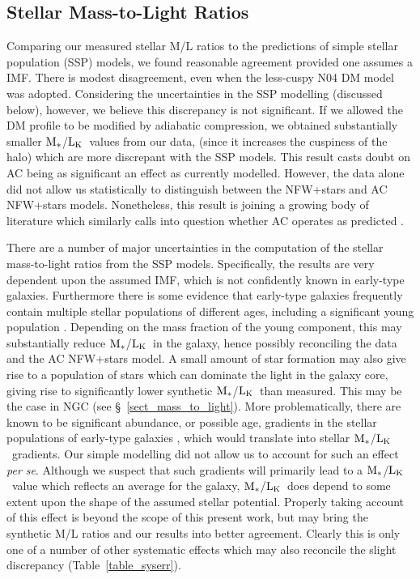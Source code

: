 \documentclass{emulateapj}
\def \eg {e.g.}
\newcommand{\mstars}{${\rm M_{*}}$}
\newcommand{\lk }{${\rm L_K}$}
\newcommand{\thin}{\thinspace}
\begin{document}
\subsection{Stellar Mass-to-Light Ratios} \label{discussion_mass_to_light}
Comparing our measured stellar M/L ratios
to the predictions of simple stellar population (SSP)
models, we found reasonable agreement provided one assumes
a \citet{kroupa01a} IMF. There is modest disagreement,
even when the less-cuspy N04 DM model was adopted.
Considering the uncertainties in the SSP modelling 
(discussed below), however, we believe this discrepancy 
is not significant.
If we allowed the DM 
profile to be modified by adiabatic compression, we obtained
substantially smaller \mstars/\lk\ values from our data,
(since it increases the cuspiness of the halo)
which are more discrepant with the SSP models. This result
casts doubt on AC being as significant an effect as currently modelled. 
However, the data
alone did not allow us statistically to distinguish between
the NFW+stars and AC NFW+stars models.
Nonetheless, this result is joining a growing body of literature
which similarly calls into question whether AC operates as
predicted \citep{zappacosta06a,kassin06a,sand04a}.


There are a number of major uncertainties in the 
computation of the stellar mass-to-light ratios from the SSP models.
Specifically, the results are very dependent upon the 
assumed IMF, which is not confidently known in early-type
galaxies.
Furthermore there is some evidence that early-type galaxies
frequently contain multiple stellar populations of different
ages, including a significant young population
\citep[\eg][]{rembold05a,nolan06a}. Depending on the mass
fraction of the young component, this may substantially 
reduce \mstars/\lk\ in the galaxy, hence possibly reconciling
the data and the AC NFW+stars model. 
A small amount of star formation may also give rise to a 
population of stars which can dominate the light in the galaxy
core, giving rise to significantly lower synthetic \mstars/\lk\
than measured. This may be the case in NGC\thin 720 (see 
\S~\ref{sect_mass_to_light}).
More problematically, there
are known to be significant abundance, or possible age,
gradients in the stellar populations of early-type galaxies 
\citep[\eg][]{trager00a,kobayashi99a,rembold05a}, which would translate
into stellar \mstars/\lk\ gradients. Our simple modelling
did not allow us to account for such an effect {\em per se}.
Although we suspect that such gradients
will primarily lead to a \mstars/\lk\ value which reflects
an average for the galaxy, \mstars/\lk\ does depend to 
some extent upon the shape of the assumed stellar potential.
Properly taking account of this effect is beyond the scope
of this present work, but may bring the synthetic M/L ratios
and our results into better agreement. Clearly this is only
one of a number of other systematic effects which may also
reconcile the slight discrepancy
(Table~\ref{table_syserr}).
\end{document}
